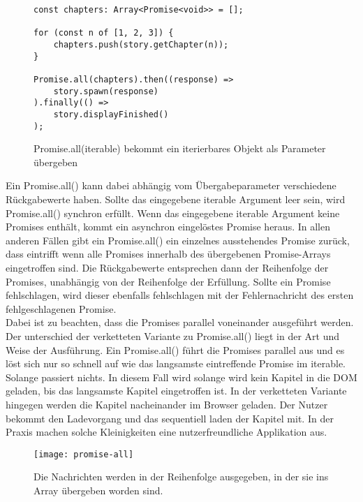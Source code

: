 \begin{figure}[H]
\begin{lstlisting}[basicstyle=\small]
const chapters: Array<Promise<void>> = [];

for (const n of [1, 2, 3]) {
    chapters.push(story.getChapter(n));
}

Promise.all(chapters).then((response) =>
    story.spawn(response)
).finally(() =>
    story.displayFinished()
);
\end{lstlisting}
\caption{Promise.all(iterable) bekommt ein iterierbares Objekt als Parameter übergeben}
\label{Promise-all-example}
\end{figure}

\noindent
Ein Promise.all() kann dabei abhängig vom Übergabeparameter verschiedene Rückgabewerte haben. Sollte das eingegebene iterable Argument leer sein, wird Promise.all() synchron erfüllt. Wenn das eingegebene iterable Argument keine Promises enthält, kommt ein asynchron eingelöstes Promise heraus. In allen anderen Fällen gibt ein Promise.all() ein einzelnes ausstehendes Promise zurück, dass eintrifft wenn alle Promises innerhalb des übergebenen Promise-Arrays eingetroffen sind. Die Rückgabewerte entsprechen dann der Reihenfolge der Promises, unabhängig von der Reihenfolge der Erfüllung.\cite{promise-all} Sollte ein Promise fehlschlagen, wird dieser ebenfalls fehlschlagen mit der Fehlernachricht des ersten fehlgeschlagenen Promise.\cite{promise-executor}\\

\noindent
Dabei ist zu beachten, dass die Promises parallel voneinander ausgeführt werden. Der unterschied der verketteten Variante zu Promise.all() liegt in der Art und Weise der Ausführung. Ein Promise.all() führt die Promises parallel aus und es löst sich nur so schnell auf wie das langsamste eintreffende Promise im iterable. Solange passiert nichts. In diesem Fall wird solange wird kein Kapitel in die DOM geladen, bis das langsamste Kapitel eingetroffen ist. In der verketteten Variante hingegen werden die Kapitel nacheinander im Browser geladen. Der Nutzer bekommt den Ladevorgang und das sequentiell laden der Kapitel mit. In der Praxis machen solche Kleinigkeiten eine nutzerfreundliche Applikation aus. 

\begin{figure}[H]
\centering
\texttt{[image: promise-all]}
\caption{Die Nachrichten werden in der Reihenfolge ausgegeben, in der sie ins Array übergeben worden sind.}
\end{figure}

